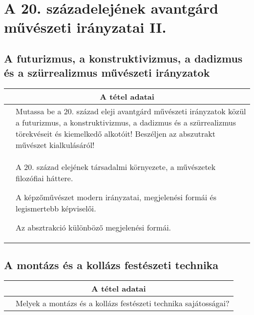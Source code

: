 \chapter{A 20. századelejének avantgárd művészeti irányzatai II.} %
\label{ch:17_avantgard_masodik_fele}

\section{A futurizmus, a konstruktivizmus, a dadizmus és a szürrealizmus művészeti irányzatok}

\begin{center}
	\begin{longtable}{ | p{} | p{} | }
		
		\hline
		\multicolumn{2}{|c|}{\textbf{A tétel adatai}}
		\\ \hline
		\hline
		
		\centering{Tétel teljes címe}
		&
		Mutassa be a 20. század eleji avantgárd művészeti irányzatok közül a futurizmus, a konstruktivizmus, a dadizmus és a szürrealizmus törekvéseit és kiemelkedő alkotóit! Beszéljen az abszutrakt művészet kialkulásáról!
		\\ \hline
		
		\centering{Jegyzetek}
		&
		\begin{compactitem}
			\item A 20. század elejének társadalmi környezete, a művészetek filozófiai háttere.
			\item A képzőművészet modern irányzatai, megjelenési formái és legismertebb képviselői.
			\item Az absztrakció különböző megjelenési formái.
		\end{compactitem}
		\\\hline
		
	\end{longtable}
\end{center}

\cleardoublepage


\section{A montázs és a kollázs festészeti technika}

\begin{center}
	\begin{longtable}{ | p{} | p{} | }
		
		\hline
		\multicolumn{2}{|c|}{\textbf{A tétel adatai}}
		\\ \hline
		\hline
		
		\centering{Tétel teljes címe}
		&
		Melyek a montázs és a kollázs festészeti technika sajátosságai?
		\\ \hline
		
	\end{longtable}
\end{center}
